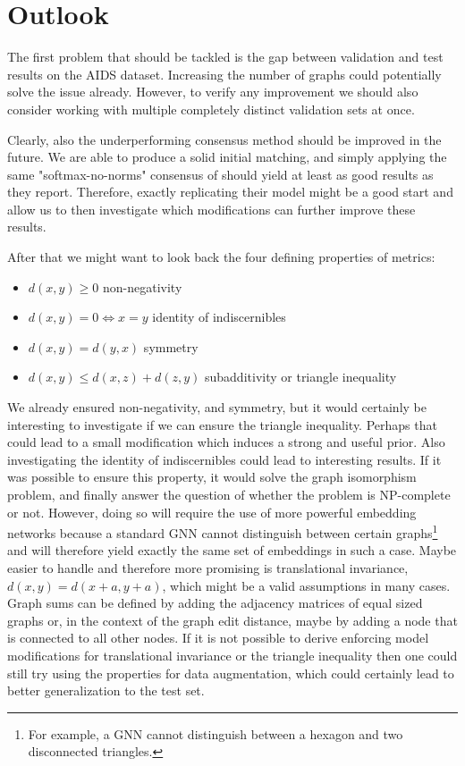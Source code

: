 \section{Outlook}

The first problem that should be tackled is the gap between validation and test results on the AIDS dataset. Increasing the number of graphs could potentially solve the issue already. However, to verify any improvement we should also consider working with multiple completely distinct validation sets at once.

Clearly, also the underperforming consensus method should be improved in the future. We are able to produce a solid initial matching, and simply applying the same "softmax-no-norms" consensus of \cite{fey2020_update} should yield at least as good results as they report. Therefore, exactly replicating their model might be a good start and allow us to then investigate which modifications can further improve these results.

After that we might want to look back the four defining properties of metrics:
\begin{itemize}
    \itemsep0em
    \item $d(x,y) \ge 0$ non-negativity
    \item $d(x,y) = 0 \Leftrightarrow x = y$ identity of indiscernibles
    \item $d(x,y)  = d(y,x)$ symmetry
    \item $d(x,y) \le d(x,z) + d(z, y)$ subadditivity or triangle inequality
\end{itemize}
We already ensured non-negativity, and symmetry, but it would certainly be interesting to investigate if we can ensure the triangle inequality. Perhaps that could lead to a small modification which induces a strong and useful prior. Also investigating the identity of indiscernibles could lead to interesting results. If it was possible to ensure this property, it would solve the graph isomorphism problem, and finally answer the question of whether the problem is NP-complete or not. However, doing so will require the use of more powerful embedding networks because a standard GNN cannot distinguish between certain graphs\footnote{For example, a GNN cannot distinguish between a hexagon and two disconnected triangles.} and will therefore yield exactly the same set of embeddings in such a case. Maybe easier to handle and therefore more promising is translational invariance, $d(x,y) = d(x+a,y+a)$, which might be a valid assumptions in many cases. Graph sums can be defined by adding the adjacency matrices of equal sized graphs \cite{graph_sum2004} or, in the context of the graph edit distance, maybe by adding a node that is connected to all other nodes. If it is not possible to derive enforcing model modifications for translational invariance or the triangle inequality then one could still try using the properties for data augmentation, which could certainly lead to better generalization to the test set.

